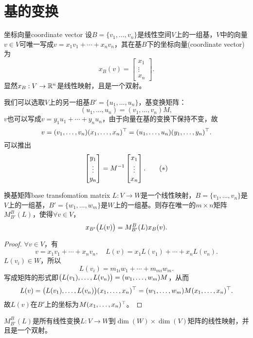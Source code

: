 \section{基的变换}
\begin{definition}{坐标向量}{coordinate vector}
	设$B=\{v_1,\ldots,v_n\}$是线性空间$V$上的一组基，$V$中的向量$v\in V$可唯一写成$v=x_1v_1+\cdots+x_nv_n$，其在基$B$下的坐标向量(coordinate vector)为
	\[
		x_B(v)=\begin{bmatrix}
			x_1\\\vdots\\x_n
		\end{bmatrix}.
	\]
	显然$x_B:V\to\mathbb R^n$是线性映射，且是一个双射。
\end{definition}
我们可以选取$V$上的另一组基$B'=\{u_1,\ldots,u_n\}$，基变换矩阵：
\[
	(u_1,\ldots,u_n)=(v_1,\ldots,v_n)M,\tag{$\ast$}
\]
$v$也可以写成$v=y_1u_1+\cdots+y_nu_n$，由于向量在基的变换下保持不变，故
\[
	v=(v_1,\ldots,v_n)(x_1,\ldots,x_n)^\top=(u_1,\ldots,u_n)(y_1,\ldots,y_n)^\top.
\]
可以推出
\[
	\begin{bmatrix}
		y_1\\\vdots\\y_n
	\end{bmatrix}=M^{-1}\begin{bmatrix}
		x_1\\\vdots\\x_n
	\end{bmatrix}.\tag{$\ast$}
\]
\begin{theorem}{换基矩阵}{base transfomation matrix}
	$L:V\to W$是一个线性映射，$B=\{v_1,\ldots,v_n\}$是$V$上的一组基，$B'=\{w_1,\ldots,w_m\}$是$W$上的一组基。则存在唯一的$m\times n$矩阵$M_{B'}^B(L)$，使得$\forall v\in V$，
	\[
		x_{B'}\bigl(L(v)\bigr)=M_{B'}^B(L)x_B(v).
	\]
\end{theorem}
\begin{proof}
	$\forall v\in V$，有
	\[
		v=x_1v_1+\cdots+x_nv_n,\quad L(v)=x_1L(v_1)+\cdots+x_nL(v_n).
	\]
	$L(v_i)\in W$，所以
	\[
		L(v_i)=m_{1i}w_1+\cdots+m_{mi}w_m.
	\]
	写成矩阵的形式即$\bigl(L(v_1),\ldots,L(v_n)\bigr)=(w_1,\ldots,w_m)M$，从而
	\[
		L(v)=\bigl(L(v_1),\ldots,L(v_n)\bigr)(x_1,\ldots,x_n)^\top=(w_1,\ldots,w_m)M(x_1,\ldots,x_n)^\top.
	\]
	故$L(v)$在$B'$上的坐标为$M(x_1,\ldots,x_n)^\top$。
\end{proof}

$M_{B'}^B(L)$是所有线性变换$L:V\to W$到$\dim(W)\times\dim(V)$矩阵的线性映射，并且是一个双射。

